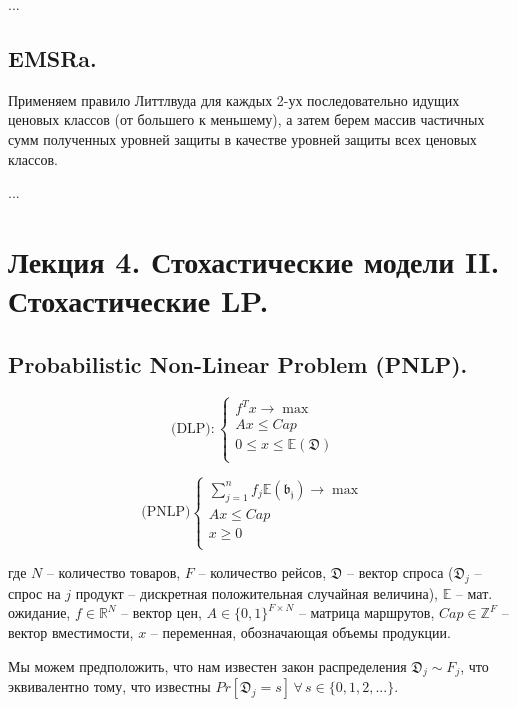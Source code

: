 \documentclass[reqno]{article}
\theoremstyle{definition}
\theoremstyle{definition}
\theoremstyle{definition}
\theoremstyle{definition}
\theoremstyle{definition}
\theoremstyle{definition}
\theoremstyle{definition}
\theoremstyle{definition}
\theoremstyle{definition}
\begin{document}
		...
		
		
		\subsection{EMSRa.}
		Применяем правило Литтлвуда для каждых 2-ух последовательно идущих ценовых классов (от большего к меньшему), а затем берем массив частичных сумм полученных уровней защиты в качестве уровней защиты всех ценовых классов.
		
		...
		
	
	\newpage
	\section{Лекция 4. Стохастические модели II. Стохастические LP.}
			
		\subsection{Probabilistic Non-Linear Problem (PNLP).}
		
		\begin{multicols}{2}
			$$
			\text{(DLP)}:
			\begin{cases}
				f^Tx \rightarrow \max & \\
				Ax \leq Cap & \\
				0 \leq x \leq \mathds{E}(\mathfrak{D}) & \\
			\end{cases}	
			$$
			
			\columnbreak
			
			$$
			\text{(PNLP)}
			\begin{cases}
				\sum\limits_{j=1}^n f_j \mathds{E}(\mathfrak{b_j}) \rightarrow \max & \\
				Ax \leq Cap & \\
				x \geq 0 & \\
			\end{cases}
			$$
		\end{multicols}
		
		где $N$ -- количество товаров, $F$ -- количество рейсов, $\mathfrak{D}$ -- вектор спроса ($\mathfrak{D}_j$ -- спрос на $j$ продукт -- дискретная положительная случайная величина), $\mathds{E}$ -- мат. ожидание, $f \in \mathds{R}^N$ -- вектор цен, $A \in \{0, 1\}^{F \times N}$ -- матрица маршрутов, $Cap \in \mathds{Z}^F$ -- вектор вместимости, $x$ -- переменная, обозначающая объемы продукции.
		
		Мы можем предположить, что нам известен закон распределения $\mathfrak{D}_j \sim F_j$, что эквивалентно тому, что известны $Pr[\mathfrak{D}_j = s]\,\forall\,s \in \{0, 1, 2, ...\}$.
		
\end{document}
